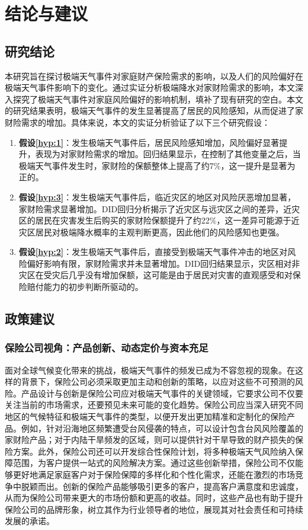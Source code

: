 \chapter{结论与建议}\label{chap:5}

\section{研究结论}
本研究旨在探讨极端天气事件对家庭财产保险需求的影响，以及人们的风险偏好在极端天气事件影响下的变化。通过实证分析极端降水对家财险需求的影响，本文深入探究了极端天气事件对家庭风险偏好的影响机制，填补了现有研究的空白。本文的研究结果表明，极端天气事件的发生显著提高了居民的风险感知，从而促进了家财险需求的增加。具体来说，本文的实证分析验证了以下三个研究假设：

\begin{enumerate}
    \item \textbf{假设\ref{hyp:1}}：发生极端天气事件后，居民风险感知增加，风险偏好显著提升，表现为对家财险需求的增加。回归结果显示，在控制了其他变量之后，当极端天气事件发生时，家财险的保额整体上提高了约7\%，这一提升是显著为正的。
    \item \textbf{假设\ref{hyp:3}}：发生极端天气事件后，临近灾区的地区对风险厌恶增加显著，家财险需求显著增加。DID回归分析揭示了近灾区与远灾区之间的差异，近灾区的居民在灾害发生后购买的家财险保额提升了约22\%，这一差异可能源于近灾区居民对极端降水概率的主观判断更高，因此他们的风险感知也更强。
    \item \textbf{假设\ref{hyp:2}}：发生极端天气事件后，直接受到极端天气事件冲击的地区对风险偏好影响有限，家财险需求并未显著增加。DID回归结果显示，灾区相对非灾区在受灾后几乎没有增加保额，这可能是由于居民对灾害的直观感受和对保险赔付能力的初步判断所驱动的。
\end{enumerate}

\section{政策建议}
\subsection{保险公司视角：产品创新、动态定价与资本充足}
面对全球气候变化带来的挑战，极端天气事件的频发已成为不容忽视的现象。在这样的背景下，保险公司必须采取更加主动和创新的策略，以应对这些不可预测的风险。产品设计与创新是保险公司应对极端天气事件的关键领域，它要求公司不仅要关注当前的市场需求，还要预见未来可能的变化趋势。保险公司应当深入研究不同地区的气候特征和极端天气事件的类型，以便开发出更加精准和定制化的保险产品。例如，针对沿海地区频繁遭受台风侵袭的特点，可以设计包含台风风险覆盖的家财险产品；对于内陆干旱频发的区域，则可以提供针对干旱导致的财产损失的保险方案。此外，保险公司还可以开发综合性保险计划，将多种极端天气风险纳入保障范围，为客户提供一站式的风险解决方案。通过这些创新举措，保险公司不仅能够更好地满足家庭客户对于保险保障的多样化和个性化需求，还能在激烈的市场竞争中脱颖而出。创新的保险产品能够吸引更多的客户，提高客户满意度和忠诚度，从而为保险公司带来更大的市场份额和更高的收益。同时，这些产品也有助于提升保险公司的品牌形象，树立其作为行业领导者的地位，展现其对社会责任和可持续发展的承诺。


